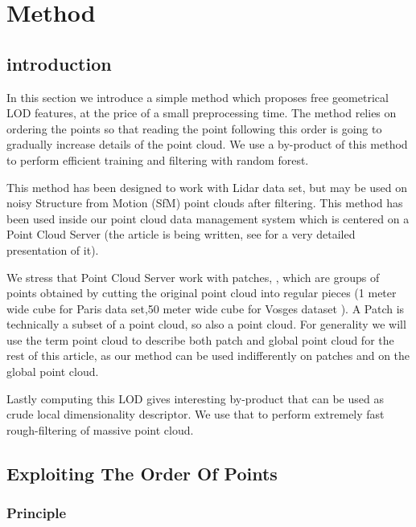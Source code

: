 

\section{\label{sec:method}Method}
	\subsection{introduction}
	 	In this section we introduce a simple method which proposes free geometrical LOD features, at the price of a small preprocessing time.
	 	The method relies on ordering the points so that reading the point following this order is going to gradually increase details of the point cloud.
	 	We use a by-product of this method to perform efficient training and filtering with random forest.
	 	
	 	
	 	This method has been designed to work with Lidar data set, but may be used on noisy Structure from Motion (SfM) point clouds after filtering.
	 	This method has been used inside our point cloud data management system which is centered on a Point Cloud Server (the article is being written, see for a very detailed presentation of it).
	 	
	 	We stress that Point Cloud Server work with patches, , which are groups of points obtained by cutting the original point cloud into regular pieces (1 meter wide cube for Paris data set,50 meter wide cube for Vosges dataset ).
	 	A Patch is technically a subset of a point cloud, so also a point cloud. For generality we will use the term point cloud to describe both patch and global point cloud for the rest of this article, as our method can be used indifferently on patches and on the global point cloud.
	 	
	 	
	 	Lastly computing this LOD gives interesting by-product that can be used as crude local dimensionality descriptor. We use that to perform extremely fast rough-filtering of massive point cloud. 
	 	 
	\subsection{Exploiting The Order Of Points }
		\subsubsection{Principle} 
			
